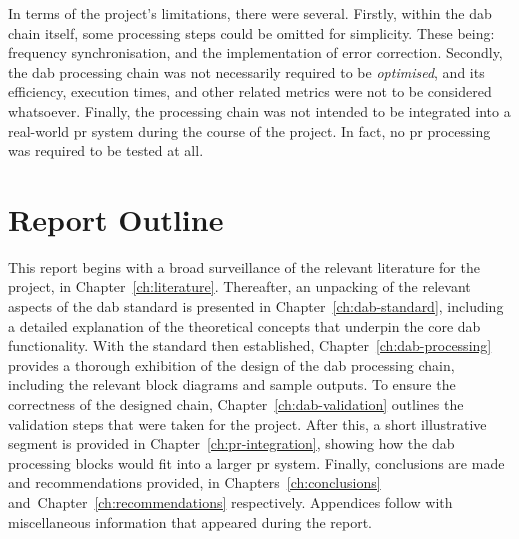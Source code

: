 \documentclass[class=report,11pt,crop=false]{standalone}
\begin{document}
In terms of the project's limitations, there were several. Firstly, within the \gls{dab} chain itself, some processing steps could be omitted for simplicity. These being: frequency synchronisation, and the implementation of error correction. Secondly, the \gls{dab} processing chain was not necessarily required to be \emph{optimised}, and its efficiency, execution times, and other related metrics were not to be considered whatsoever. Finally, the processing chain was not intended to be integrated into a real-world \gls{pr} system during the course of the project. In fact, no \gls{pr} processing was required to be tested at all.

\section{Report Outline}
This report begins with a broad surveillance of the relevant literature for the project, in Chapter~\ref{ch:literature}. Thereafter, an unpacking of the relevant aspects of the \gls{dab} standard is presented in Chapter~\ref{ch:dab-standard}, including a detailed explanation of the theoretical concepts that underpin the core \gls{dab} functionality. With the standard then established, Chapter~\ref{ch:dab-processing} provides a thorough exhibition of the design of the \gls{dab} processing chain, including the relevant block diagrams and sample outputs. To ensure the correctness of the designed chain, Chapter~\ref{ch:dab-validation} outlines the validation steps that were taken for the project. After this, a short illustrative segment is provided in Chapter~\ref{ch:pr-integration}, showing how the \gls{dab} processing blocks would fit into a larger \gls{pr} system. Finally, conclusions are made and recommendations provided, in Chapters~\ref{ch:conclusions} and~Chapter~\ref{ch:recommendations} respectively. Appendices follow with miscellaneous information that appeared during the report.



\ifstandalone

\printnoidxglossary[type=\acronymtype,nonumberlist]
\fi
\end{document}

